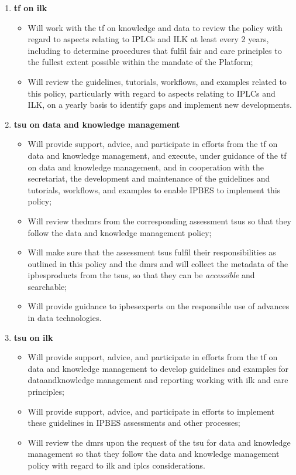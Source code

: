\documentclass{article}
\begin{document}
\begin{enumerate}[label=(\alph*)]
    \item \textbf{\gls{tf} on \gls{ilk}}
    \begin{itemize}
        \item Will work with the \gls{tf} on knowledge and data to review the policy with regard to aspects relating to IPLCs and ILK at least every 2 years, including to determine procedures that fulfil \gls{fair} and \gls{care} principles to the fullest extent possible within the mandate of the Platform;
        \item Will review the guidelines, tutorials, \glspl{workflow}, and examples related to this policy, particularly with regard to aspects relating to IPLCs and ILK, on a yearly basis to identify gaps and implement new developments.
    \end{itemize}

    \item \textbf{\gls{tsu} on data and knowledge management}
    \begin{itemize}
        \item Will provide support, advice, and participate in efforts from the \gls{tf} on data and knowledge management, and execute, under guidance of the \gls{tf} on data and knowledge management, and in cooperation with the \gls{secretariat}, the development and maintenance of the guidelines and tutorials, \glspl{workflow}, and examples to enable IPBES to implement this policy;
        \item Will review the\glspl{dmr} from the corresponding assessment \glspl{tsu} so that they follow the data and knowledge management policy;
        \item Will make sure that the assessment \glspl{tsu} fulfil their responsibilities as outlined in this policy and the \glspl{dmr} and will collect the metadata of the \glspl{ipbesproduct} from the \glspl{tsu}, so that they can be \textit{accessible} and searchable;
        \item Will provide guidance to \glspl{ipbesexpert} on the responsible use of advances in \gls{data} technologies.
    \end{itemize}

    \item \textbf{\gls{tsu} on \gls{ilk}}
    \begin{itemize}
        \item Will provide support, advice, and participate in efforts from the \gls{tf} on data and knowledge management to develop guidelines and examples for \gls{dataandknowledge} management and reporting working with \gls{ilk} and \gls{care} principles;
        \item Will provide support, advice, and participate in efforts to implement these guidelines in IPBES assessments and other processes;
        \item Will review the \glspl{dmr} upon the request of the \gls{tsu} for data and knowledge management so that they follow the data and knowledge management policy with regard to \gls{ilk} and \glspl{iplc} considerations.
    \end{itemize}


\end{enumerate}
\end{document}
